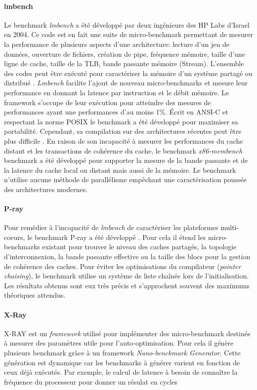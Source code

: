     \paragraph{lmbench} 
        Le benchmark \textit{lmbench}\cite{Staelin2004} a été développé par deux ingénieurs des HP Labs d'Israel en 2004. Ce code est en fait une suite de micro-benchmark permettant de mesurer la performance de plusieurs aspects d'une architecture: lecture d'un jeu de données, ouverture de fichiers, création de pipe, fréquence mémoire, taille d'une ligne de cache, taille de la TLB, bande passante mémoire (Stream). L'ensemble des codes peut être exécuté pour caractériser la mémoire d'un système partagé ou distribué \cite{Staelin2002}.
        \textit{Lmbench} facilite l'ajout de nouveau micro-benchmarks et mesure leur performance en donnant la latence par instruction et le débit mémoire. Le framework s'occupe de leur exécution pour atteindre des mesures de performances ayant une performances d'au moins 1\%. Écrit en ANSI-C et respectant la norme POSIX le benchmark a été développé pour maximiser sa portabilité. Cependant, sa compilation sur des architectures récentes peut être plus difficile \cite{Yotov2004}. En raison de son incapacité à mesurer les performances du cache distant et les transactions de cohérence du cache, le benchmark \textit{x86-membench} benchmark \cite{Molka2017b} a été développé pour supporter la mesure de la bande passante et de la latence du cache local ou distant mais aussi de la mémoire. Le benchmark n'utilise aucune méthode de parallélisme empêchant une caractérisation poussée des architectures modernes. 
        
    
    \paragraph{P-ray} 
        Pour remédier à l'incapacité de \textit{lmbench} de caractériser les plateformes multi-coeurs, le benchmark P-ray a été développé \cite{Duchateau2008}. Pour cela il étend les micro-benchmarks existant pour trouver le niveau des caches partagés, la topologie d’interconnexion, la bande passante effective ou la taille des blocs pour la gestion de cohérence des caches. Pour éviter les optimisations du compilateur (\textit{pointer chaising}), le benchmark utilise un système de liste chaînée lors de l'initialisation. Les résultats obtenus sont eux très précis et s'approchent souvent des maximums théoriques attendus.

    \paragraph{X-Ray} X-RAY \cite{Yotov2004} est un \textit{framework} utilisé pour implémenter des micro-benchmark destinés à mesurer des paramètres utile pour l’auto-optimisation. Pour cela il génère plusieurs benchmark gràce à un framework \textit{Nano-benchmark Generator}. Cette génération est dynamique car les benchmarks à générer varient en fonction de ceux déjà exécutés. Par exemple, le calcul de latence à besoin de connaître la fréquence du processeur pour donner un résulat en cycles

